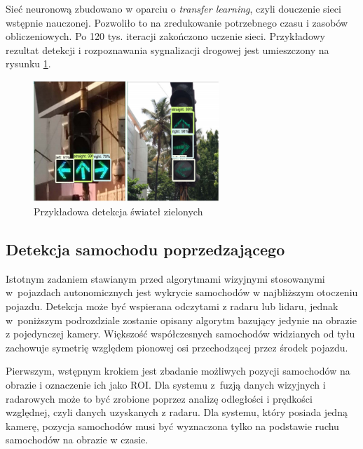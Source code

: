 Sieć neuronową zbudowano w oparciu o \textit{transfer learning}, czyli douczenie sieci wstępnie nauczonej. 
Pozwoliło to na zredukowanie potrzebnego czasu i zasobów obliczeniowych. 
Po 120 tys. iteracji zakończono uczenie sieci. 
Przykładowy rezultat detekcji i rozpoznawania sygnalizacji drogowej jest umieszczony na rysunku \ref{fig:traffic_light3_results}.

\begin{figure}
  \centering
  \includegraphics[width=7cm]{img/traffic_light3_results.png}
  \caption{Przykładowa detekcja świateł zielonych\cite{T10}}
  \label{fig:traffic_light3_results}
\end{figure}




\subsection{Detekcja samochodu poprzedzającego}
\label{sec:car_general}

Istotnym zadaniem stawianym przed algorytmami wizyjnymi stosowanymi w~pojazdach autonomicznych jest wykrycie samochodów w najbliższym otoczeniu pojazdu. 
Detekcja może być wspierana odczytami z radaru lub lidaru, jednak w~poniższym podrozdziale zostanie opisany algorytm bazujący jedynie na obrazie z pojedynczej kamery.
Większość współczesnych samochodów widzianych od tyłu zachowuje symetrię względem pionowej osi przechodzącej przez środek pojazdu. 

Pierwszym, wstępnym krokiem jest zbadanie możliwych pozycji samochodów na obrazie i oznaczenie ich jako ROI.
Dla systemu z~fuzją danych wizyjnych i radarowych może to być zrobione poprzez analizę odległości i prędkości względnej, czyli danych uzyskanych z radaru. 
Dla systemu, który posiada jedną kamerę, pozycja samochodów musi być wyznaczona tylko na podstawie ruchu samochodów na obrazie w czasie.

